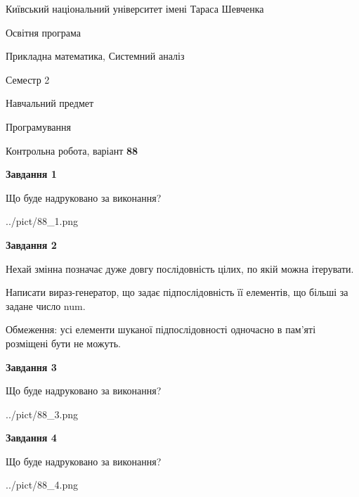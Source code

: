 \documentclass[12pt, ukrainian]{article}
\begin{document}
{{\begin {small}\par
{ \center  Київський національний університет імені Тараса Шевченка \par}
{\parbox {5 cm}{Освітня програма \hfill}{\parbox {8 cm}{Прикладна математика, Системний аналіз \hfill}}\parbox {5 cm}{\hfill Семестр 2}}\par
{\parbox {5 cm} {Навчальний предмет \hfill}\parbox {7 cm}{Програмування \hfill}\parbox {6cm}{\hfill}\par}\vspace{-7pt} \end{small}}{\center Контрольна робота, варіант  \No \textbf
{ 88 }\par}}
{
\begin {large}
{\begin {center}\textbf{Завдання 1}\end {center}}\par
Що буде надруковано за виконання?\par\par
\begin{center}
	{../pict/88_1.png}
\end{center}
\newpage

{\begin {center}\textbf{Завдання 2}\end {center}}\par
Нехай змінна  позначає дуже довгу послідовність цілих, по якій можна ітерувати.

Написати вираз-генератор, що задає підпослідовність її елементів, що більші за задане число num.

Обмеження: усі елементи шуканої підпослідовності одночасно в пам'яті розміщені бути не можуть.\par
\newpage

{\begin {center}\textbf{Завдання 3}\end {center}}\par
Що буде надруковано за виконання?
\begin{center}
	{../pict/88_3.png}
\end{center}
\newpage

{\begin {center}\textbf{Завдання 4}\end {center}}\par
Що буде надруковано за виконання?\par
\begin{center}
	{../pict/88_4.png}
\end{center}
\newpage


\end{large}}
\end{document}
